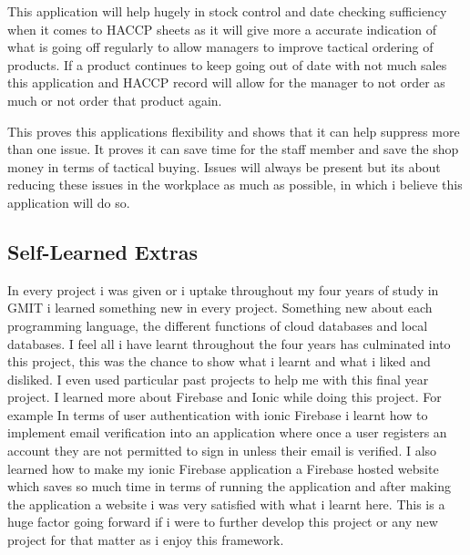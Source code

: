 This application will help hugely in stock control and date checking sufficiency when it comes to HACCP sheets as it will give more a accurate indication of what is going off regularly to allow managers to improve tactical ordering of products. If a product continues to keep going out of date with not much sales this application and HACCP record will allow for the manager to not order as much or not order that product again.
\newline

This proves this applications flexibility and shows that it can help suppress more than one issue. It proves it can save time for the staff member and save the shop money in terms of tactical buying. Issues will always be present but its about reducing these issues in the workplace as much as possible, in which i believe this application will do so. 


\subsection{Self-Learned Extras}
In every project i was given or i uptake throughout my four years of study in GMIT i learned something new in every project. Something new about each programming language, the different functions of cloud databases and local databases. I feel all i have learnt throughout the four years has culminated into this project, this was the chance to show what i learnt and what i liked and disliked. I even used particular past projects to help me with this final year project. I learned more about Firebase and Ionic while doing this project. For example In terms of user authentication with ionic Firebase i learnt how to implement email verification into an application where once a user registers an account they are not permitted to sign in unless their email is verified. I also learned how to make my ionic Firebase application a Firebase hosted website which saves so much time in terms of running the application and after making the application a website i was very satisfied with what i learnt here. This is a huge factor going forward if i were to further develop this project or any new project for that matter as i enjoy this framework. 
